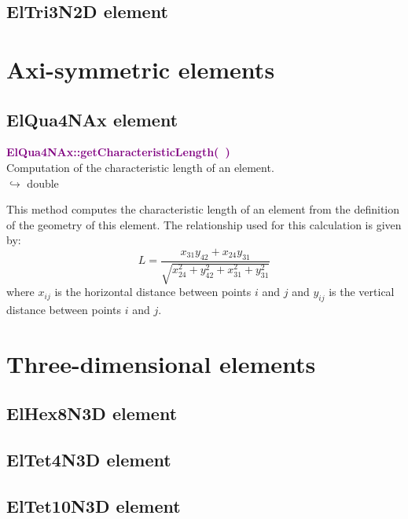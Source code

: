 \subsection{ElTri3N2D element}

\section{Axi-symmetric elements}

\subsection{ElQua4NAx element}

\textcolor{purple}{\textbf{ElQua4NAx::getCharacteristicLength(~)}}\label{ElQua4NAx::getCharacteristicLength()}\\
Computation of the characteristic length of an element.\\ \hspace*{10mm}$\hookrightarrow$ double

This method computes the characteristic length of an element from the definition of the geometry of this element.
The relationship used for this calculation is given by:
\begin{equation}
L=\frac{x_{31} y_{42}+x_{24} y_{31}}{\sqrt{x_{24}^2+y_{42}^2+x_{31}^2+y_{31}^2}}
\end{equation}
where $x_{ij}$ is the horizontal distance between points $i$ and $j$ and $y_{ij}$ is the vertical distance between points $i$ and $j$.

\section{Three-dimensional elements}

\subsection{ElHex8N3D element}

\subsection{ElTet4N3D element}

\subsection{ElTet10N3D element}
